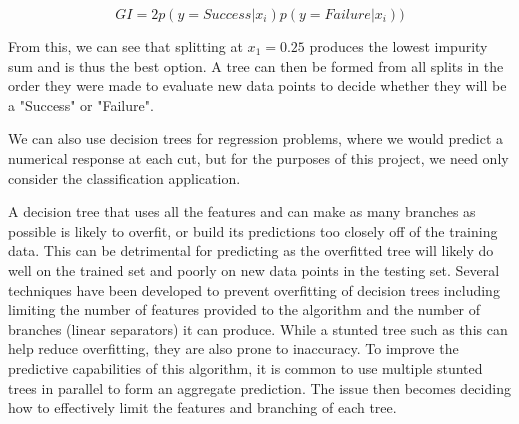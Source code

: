 \begin{equation}
    GI = 2p(y = Success | x_{i})p(y = Failure | x_{i}))
\end{equation}

From this, we can see that splitting at $x_{1} = 0.25$ produces the lowest impurity sum and is thus the best option. A tree can then be formed from all splits in the order they were made to evaluate new data points to decide whether they will be a "Success" or "Failure".



We can also use decision trees for regression problems, where we would predict a numerical response at each cut, but for the purposes of this project, we need only consider the classification application.

A decision tree that uses all the features and can make as many branches as possible is likely to overfit, or build its predictions too closely off of the training data. This can be detrimental for predicting as the overfitted tree will likely do well on the trained set and poorly on new data points in the testing set. Several techniques have been developed to prevent overfitting of decision trees including limiting the number of features provided to the algorithm and the number of branches (linear separators) it can produce. While a stunted tree such as this can help reduce overfitting, they are also prone to inaccuracy. To improve the predictive capabilities of this algorithm, it is common to use multiple stunted trees in parallel to form an aggregate prediction. The issue then becomes deciding how to effectively limit the features and branching of each tree.

